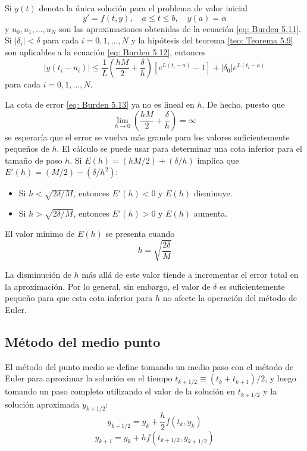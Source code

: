 \begin{theorem}
    Si $y(t)$ denota la única solución para el problema de valor inicial
    \begin{equation}
        \label{eq: Burden 5.12}
        y' = f(t,y), \quad a \leq t \leq b, \quad y(a) = \alpha
    \end{equation}
    y $u_0, u_1, ..., u_N$ son las aproximaciones obtenidas de la ecuación \ref{eq: Burden 5.11}. Si $|\delta_i| < \delta$ para cada $i = 0, 1, ..., N$ y la hipótesis del teorema \ref{teo: Teorema 5.9} son aplicables a la ecuación \ref{eq: Burden 5.12}, entonces
    \begin{equation}
        \label{eq: Burden 5.13}
        |y(t_i - u_i)| \leq \frac{1}{L} \left( \frac{hM}{2} + \frac{\delta}{h} \right) \left[ e^{L(t_i - a)} - 1 \right] + |\delta_0| e^{L(t_i - a)}
    \end{equation}
    para cada $i = 0, 1, ..., N$.
\end{theorem}

La cota de error \ref{eq: Burden 5.13} ya no es lineal en $h$. De hecho, puesto que 
\[ \lim_{h \rightarrow 0} \left( \frac{hM}{2} + \frac{\delta}{h} \right) = \infty \]
se esperaría que el error se vuelva más grande para los valores suficientemente pequeños de $h$. El cálculo se puede usar para determinar una cota inferior para el tamaño de paso $h$. Si $E(h) = (hM/2) + (\delta / h)$ implica que $E'(h) = (M/2) - (\delta / h^2)$:
\begin{itemize}
    \item Si $h < \sqrt{2\delta / M}$, entonces $E'(h) < 0$ y $E(h)$ disminuye.
    \item Si $h > \sqrt{2\delta / M}$, entonces $E'(h) > 0$ y $E(h)$ aumenta.
\end{itemize}
El valor mínimo de $E(h)$ se presenta cuando
\begin{equation}
    h = \sqrt{\frac{2\delta}{M}}
\end{equation}

La disminución de $h$ más allá de este valor tiende a incrementar el error total en la aproximación. Por lo general, sin embargo, el valor de $\delta$ es suficientemente pequeño para que esta cota inferior para $h$ no afecte la operación del método de Euler.

\subsection{Método del medio punto}

El método del punto medio se define tomando un medio paso con el método de Euler para aproximar la solución en el tiempo $t_{k + 1/2} \equiv (t_k + t_{k + 1})/2$, y luego tomando un paso completo utilizando el valor de la solución en $t_{k + 1/2}$ y la solución aproximada $y_{k + 1/2}$:
\begin{equation}
    \label{eq: Greenbaum 11.14}
    y_{k + 1/2} = y_k + \frac{h}{2} f(t_k, y_k)
\end{equation}
\begin{equation}
    \label{eq: Greenbaum 11.15}
    y_{k + 1} = y_k + h f(t_{k + 1/2}, y_{k + 1/2})
\end{equation}

